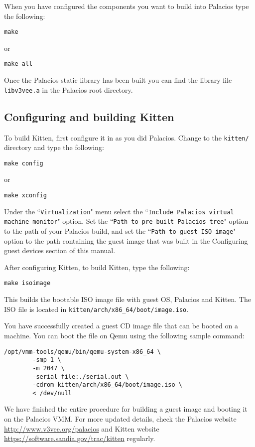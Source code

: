 \documentclass{article}[11pt]
\begin{document}
\vspace{10pt}
\noindent
When you have configured the components you want to build into Palacios type
the following:

\begin{verbatim}
make
\end{verbatim}
or
\begin{verbatim}
make all
\end{verbatim}

\vspace{10pt}
\noindent
Once the Palacios static library has been built you can find the library file
\verb+libv3vee.a+ in the Palacios root directory.

\subsection*{Configuring and building Kitten}

To build Kitten, first configure it in as you did Palacios. Change to the
\verb+kitten/+ directory and type the following:

\begin{verbatim}
make config
\end{verbatim}
or
\begin{verbatim}
make xconfig
\end{verbatim}

\vspace{10pt}
\noindent
Under the ``\verb|Virtualization|" menu select the
``\verb|Include Palacios virtual machine monitor|" option. Set the
``\verb|Path to pre-built Palacios tree|" option to the path of your Palacios
build, and set the ``\verb|Path to guest ISO image|" option to the path
containing the guest image that was built in the Configuring guest devices
section of this manual.

\vspace{10pt}
\noindent
After configuring Kitten, to build Kitten, type the following:

\begin{verbatim}
make isoimage
\end{verbatim}

\vspace{10pt}
\noindent
This builds the bootable ISO image file with guest OS, Palacios and Kitten.
The ISO file is located in \verb+kitten/arch/x86_64/boot/image.iso+.

\pagebreak
\noindent
You have successfully created a guest CD image file that can be booted on a
machine. You can boot the file on Qemu using the following sample command:

\begin{verbatim}
/opt/vmm-tools/qemu/bin/qemu-system-x86_64 \
        -smp 1 \
        -m 2047 \
        -serial file:./serial.out \
        -cdrom kitten/arch/x86_64/boot/image.iso \
        < /dev/null
\end{verbatim}

\vspace{10pt}
\noindent
We have finished the entire procedure for building a guest image and booting it
on the Palacios VMM. For more updated details, check the Palacios website
\url{http://www.v3vee.org/palacios} and Kitten website
\url{https://software.sandia.gov/trac/kitten} regularly.
\end{document}
